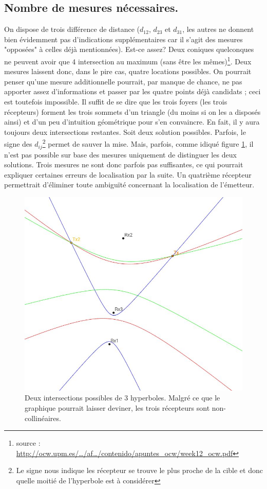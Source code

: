 \documentclass[10pt,a4paper]{article}
\begin{document}
\subsection{Nombre de mesures nécessaires.}
On dispose de trois différence de distance ($d_{12}$, $d_{23}$ et $d_{31}$, les autres ne donnent bien évidemment pas d'indications supplémentaires car il s'agit des mesures "opposées" à celles déjà mentionnées). Est-ce assez?
Deux coniques quelconques ne peuvent avoir que 4 intersection au maximum (sans être les mêmes)\footnote{source : \url{http://ocw.upm.es/…/af…/contenido/apuntes_ocw/week12_ocw.pdf}}.
Deux mesures laissent donc, dans le pire cas, quatre locations possibles. On pourrait penser qu'une mesure additionnelle pourrait, par manque de chance, ne pas apporter assez d'informations et passer par les quatre points déjà candidats ; ceci est toutefois impossible. Il suffit de se dire que les trois foyers (les trois récepteurs) forment les trois sommets d'un triangle (du moins si on les a disposés ainsi) et d'un peu d'intuition géométrique pour s'en convaincre. En fait, il y aura toujours deux intersections restantes. Soit deux solution possibles.
Parfois, le signe des $d_{ij}$\footnote{Le signe nous indique les récepteur se trouve le plus proche de la cible et donc quelle moitié de l'hyperbole est à considérer} permet de sauver la mise. Mais, parfois, comme idiqué figure \ref{int}, il n'est pas possible sur base des mesures uniquement de distinguer les deux solutions. Trois mesures ne sont donc parfois pas suffisantes, ce qui pourrait expliquer certaines erreurs de localisation par la suite. Un quatrième récepteur permettrait d'éliminer toute ambiguïté concernant la localisation de l'émetteur.
\begin{figure}[h]
\centering
\includegraphics[scale = 0.5]{hyperbole}
\caption{Deux intersections possibles de 3 hyperboles. Malgré ce que le graphique pourrait laisser deviner, les trois récepteurs sont non-collinéaires.}
\label{int}
\end{figure}
\end{document}
